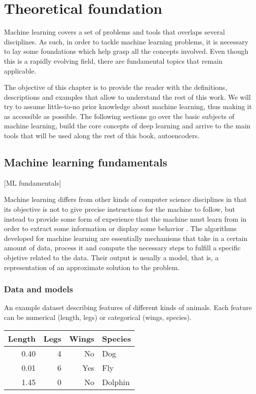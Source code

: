 \setchapterpreamble[u]{\margintoc}
\chapter{Theoretical foundation}

Machine learning covers a set of problems and tools that overlaps several disciplines. As such, in order to tackle machine learning problems, it is necessary to lay some foundations which help grasp all the concepts involved. Even though this is a rapidly evolving field, there are fundamental topics that remain applicable.

The objective of this chapter is to provide the reader with the definitions, descriptions and examples that allow to understand the rest of this work. We will try to assume little-to-no prior knowledge about machine learning, thus making it as accessible as possible. The following sections go over the basic subjects of machine learning, build the core concepts of deep learning and arrive to the main tools that will be used along the rest of this book, autoencoders.

\section{Machine learning fundamentals}[ML fundamentals]

Machine learning differs from other kinds of computer science disciplines in that its objective is not to give precise instructions for the machine to follow, but instead to provide some form of experience that the machine must learn from in order to extract some information or display some behavior . The algorithms developed for machine learning are essentially mechanisms that take in a certain amount of data, process it and compute the necessary steps to fulfill a specific objetive related to the data. Their output is usually a model, that is, a representation of an approximate solution to the problem. 
 
\subsection{Data and models}

\begin{margintable}
\caption[An example dataset describing features of different kinds of animals.]{\label{tbl:dataset}An example dataset describing features of different kinds of animals. Each feature can be numerical (length, legs) or categorical (wings, species).}\footnotesize
\begin{tabular}{rrrl}\toprule
Length & Legs & Wings & Species\\\midrule
0.40 & 4 & No & Dog\\
0.01 & 6 & Yes & Fly\\
1.45 & 0 & No & Dolphin\\\bottomrule
\end{tabular}
\end{margintable}

